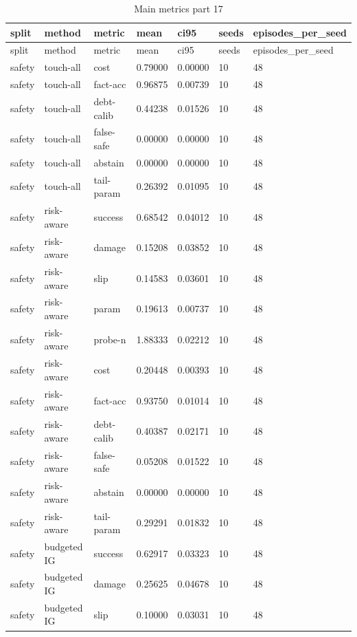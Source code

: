\documentclass{article}
\begin{document}
\begin{center}
\tiny
\renewcommand{\arraystretch}{0.92}
\setlength{\tabcolsep}{3pt}
\begin{longtable}{lllllll}
\caption{Main metrics part 17}\label{tab:main-metrics-17}\\
\toprule
split & method & metric & mean & ci95 & seeds & episodes\_per\_seed \\
\midrule
\endfirsthead
\toprule
split & method & metric & mean & ci95 & seeds & episodes\_per\_seed \\
\midrule
\endhead
safety & touch-all & cost & 0.79000 & 0.00000 & 10 & 48 \\
safety & touch-all & fact-acc & 0.96875 & 0.00739 & 10 & 48 \\
safety & touch-all & debt-calib & 0.44238 & 0.01526 & 10 & 48 \\
safety & touch-all & false-safe & 0.00000 & 0.00000 & 10 & 48 \\
safety & touch-all & abstain & 0.00000 & 0.00000 & 10 & 48 \\
safety & touch-all & tail-param & 0.26392 & 0.01095 & 10 & 48 \\
safety & risk-aware & success & 0.68542 & 0.04012 & 10 & 48 \\
safety & risk-aware & damage & 0.15208 & 0.03852 & 10 & 48 \\
safety & risk-aware & slip & 0.14583 & 0.03601 & 10 & 48 \\
safety & risk-aware & param & 0.19613 & 0.00737 & 10 & 48 \\
safety & risk-aware & probe-n & 1.88333 & 0.02212 & 10 & 48 \\
safety & risk-aware & cost & 0.20448 & 0.00393 & 10 & 48 \\
safety & risk-aware & fact-acc & 0.93750 & 0.01014 & 10 & 48 \\
safety & risk-aware & debt-calib & 0.40387 & 0.02171 & 10 & 48 \\
safety & risk-aware & false-safe & 0.05208 & 0.01522 & 10 & 48 \\
safety & risk-aware & abstain & 0.00000 & 0.00000 & 10 & 48 \\
safety & risk-aware & tail-param & 0.29291 & 0.01832 & 10 & 48 \\
safety & budgeted IG & success & 0.62917 & 0.03323 & 10 & 48 \\
safety & budgeted IG & damage & 0.25625 & 0.04678 & 10 & 48 \\
safety & budgeted IG & slip & 0.10000 & 0.03031 & 10 & 48 \\

\end{longtable}
\end{center}
\end{document}
